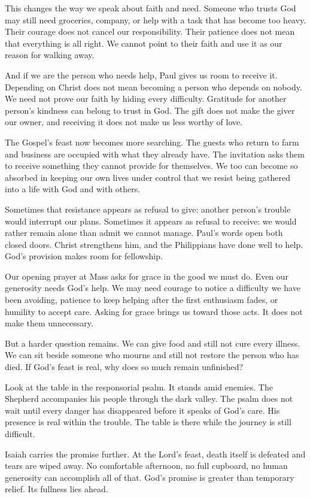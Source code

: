 This changes the way we speak about faith and need. Someone who trusts God may still need groceries, company, or help with a task that has become too heavy. Their courage does not cancel our responsibility. Their patience does not mean that everything is all right. We cannot point to their faith and use it as our reason for walking away.

And if we are the person who needs help, Paul gives us room to receive it. Depending on Christ does not mean becoming a person who depends on nobody. We need not prove our faith by hiding every difficulty. Gratitude for another person's kindness can belong to trust in God. The gift does not make the giver our owner, and receiving it does not make us less worthy of love.

The Gospel's feast now becomes more searching. The guests who return to farm and business are occupied with what they already have. The invitation asks them to receive something they cannot provide for themselves. We too can become so absorbed in keeping our own lives under control that we resist being gathered into a life with God and with others.

Sometimes that resistance appears as refusal to give: another person's trouble would interrupt our plans. Sometimes it appears as refusal to receive: we would rather remain alone than admit we cannot manage. Paul's words open both closed doors. Christ strengthens him, and the Philippians have done well to help. God's provision makes room for fellowship.

Our opening prayer at Mass asks for grace in the good we must do. Even our generosity needs God's help. We may need courage to notice a difficulty we have been avoiding, patience to keep helping after the first enthusiasm fades, or humility to accept care. Asking for grace brings us toward those acts. It does not make them unnecessary.

But a harder question remains. We can give food and still not cure every illness. We can sit beside someone who mourns and still not restore the person who has died. If God's feast is real, why does so much remain unfinished?

Look at the table in the responsorial psalm. It stands amid enemies. The Shepherd accompanies his people through the dark valley. The psalm does not wait until every danger has disappeared before it speaks of God's care. His presence is real within the trouble. The table is there while the journey is still difficult.

Isaiah carries the promise further. At the Lord's feast, death itself is defeated and tears are wiped away. No comfortable afternoon, no full cupboard, no human generosity can accomplish all of that. God's promise is greater than temporary relief. Its fullness lies ahead.

